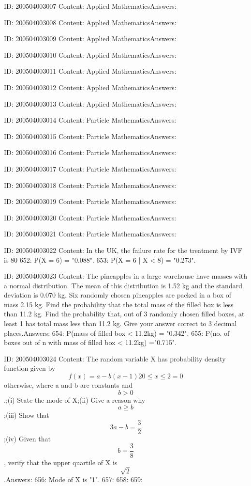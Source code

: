 \documentclass{article}
\begin{document}
ID: 200504003007
Content:
Applied MathematicsAnswers:

ID: 200504003008
Content:
Applied MathematicsAnswers:

ID: 200504003009
Content:
Applied MathematicsAnswers:

ID: 200504003010
Content:
Applied MathematicsAnswers:

ID: 200504003011
Content:
Applied MathematicsAnswers:

ID: 200504003012
Content:
Applied MathematicsAnswers:

ID: 200504003013
Content:
Applied MathematicsAnswers:

ID: 200504003014
Content:
Particle MathematicsAnswers:

ID: 200504003015
Content:
Particle MathematicsAnswers:

ID: 200504003016
Content:
Particle MathematicsAnswers:

ID: 200504003017
Content:
Particle MathematicsAnswers:

ID: 200504003018
Content:
Particle MathematicsAnswers:

ID: 200504003019
Content:
Particle MathematicsAnswers:

ID: 200504003020
Content:
Particle MathematicsAnswers:

ID: 200504003021
Content:
Particle MathematicsAnswers:

ID: 200504003022
Content:
In the UK, the failure rate for the treatment by IVF is 80%
652: P(X = 6) = "0.088".
653: P(X = 6 | X < 8) = "0.273".

ID: 200504003023
Content:
The pineapples in a large warehouse have masses with a normal distribution. The mean of this distribution is 1.52 kg and the standard deviation is 0.070 kg. Six randomly chosen pineapples are packed in a box of mass 2.15 kg. Find the probability that the total mass of the filled box is less than 11.2 kg. Find the probability that, out of 3 randomly chosen filled boxes, at least 1 has total mass less than 11.2 kg. Give your answer correct to 3 decimal places.Answers:
654: P(mass of filled box < 11.2kg) = "0.342".
655: P(no. of boxes out of n with mass of filled box < 11.2kg) ="0.715".

ID: 200504003024
Content:
The random variable X has probability density function given by $$f(x) = a-b(x-1)2  0 \leq x \leq 2  = 0 $$ otherwise,  where a and b are constants and $$b > 0$$.;(i) State the mode of X;(ii) Give a reason why $$a \geq b$$;(iii) Show that $$3a - b = \frac{3}{2}$$;(iv) Given that $$b = \frac{3}{8}$$, verify that the upper quartile of X is $$\sqrt 2$$.Answers:
656: Mode of X is "1".
657: 
658: 
659: 
\end{document}
